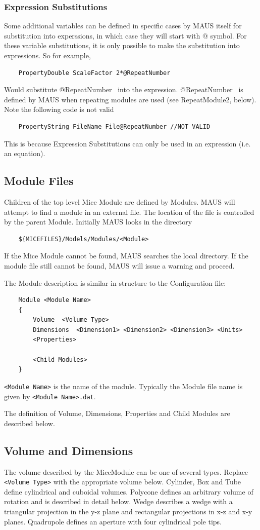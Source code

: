 \subsubsection{Expression Substitutions}
Some additional variables can be defined in specific cases by MAUS itself for substitution into experssions, in which
case they will start with @ symbol. For these variable substitutions, it is only possible to make the substitution into
expressions. So for example,
\begin{verbatim}
    PropertyDouble ScaleFactor 2*@RepeatNumber
\end{verbatim}
Would substitute @RepeatNumber \ into the expression. @RepeatNumber \ is defined by MAUS when repeating modules are
used (see RepeatModule2, below). Note the following code is not valid
\begin{verbatim}
    PropertyString FileName File@RepeatNumber //NOT VALID
\end{verbatim}
This is because Expression Substitutions can only be used in an expression (i.e. an equation).

\subsection[Module Files]{Module Files}
Children of the top level Mice Module are defined by Modules. MAUS will attempt to find a module in an external file.
The location of the file is controlled by the parent Module. Initially MAUS looks in the directory
\begin{verbatim}
    ${MICEFILES}/Models/Modules/<Module>
\end{verbatim}
If the Mice Module cannot be found, MAUS searches the local directory. If the module file still cannot be found,
MAUS will issue a warning and proceed.

The Module description is similar in structure to the Configuration file:
\begin{verbatim}
    Module <Module Name>
    {
        Volume  <Volume Type>
        Dimensions  <Dimension1> <Dimension2> <Dimension3> <Units>
        <Properties>

        <Child Modules>
    }
\end{verbatim}
\verb|<Module Name>| is the name of the module. Typically the Module file name is given by
\verb|<Module Name>.dat|.

The definition of Volume, Dimensions, Properties and Child Modules are described below.

\subsection{Volume and Dimensions}
The volume described by the MiceModule can be one of several types. Replace \verb|<Volume Type>| with the
appropriate volume below. Cylinder, Box and Tube define cylindrical and cuboidal volumes.
Polycone defines an arbitrary volume of rotation and is described in detail below. Wedge describes a wedge with a
triangular projection in the y-z plane and rectangular projections in x-z and x-y planes. Quadrupole defines an
aperture with four cylindrical pole tips.

